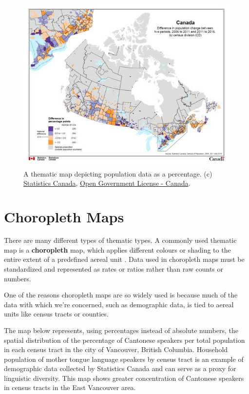 \documentclass[
]{book}
\begin{document}
\begin{figure}
\centering
\includegraphics{images/17-population.png}
\caption{A thematic map depicting population data as a percentage. \citep{statistics_canada_illustrated_2017} (c) \href{https://www-statcan-gc-ca.eu1.proxy.openathens.net/eng/about/about?MM=as}{Statistics Canada}, \href{https://open.canada.ca/en/open-government-licence-canada}{Open Government License - Canada}.}
\end{figure}

\hypertarget{choropleth-maps}{%
\section{Choropleth Maps}\label{choropleth-maps}}

There are many different types of thematic types. A commonly used thematic map is a \textbf{choropleth} map, which applies different colours or shading to the entire extent of a predefined aereal unit \citep{weiss_population_2008}. Data used in choropleth maps must be standardized and represented as rates or ratios rather than raw counts or numbers.

One of the reasons choropleth maps are so widely used is because much of the data with which we're concerned, such as demographic data, is tied to aereal units like census tracts or counties.

The map below represents, using percentages instead of absolute numbers, the spatial distribution of the percentage of Cantonese speakers per total population in each census tract in the city of Vancouver, British Columbia. Household population of mother tongue language speakers by census tract is an example of demographic data collected by Statistics Canada and can serve as a proxy for linguistic diversity. This map shows greater concentration of Cantonese speakers in census tracts in the East Vancouver area.
\end{document}
